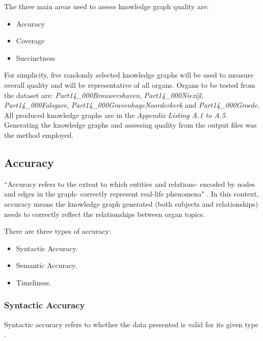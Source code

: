 The three main areas used to assess knowledge graph quality are: 

\vspace{-0.2cm}
\begin{itemize}
    \itemsep0em 
    \item Accuracy
    \vspace{-0.15cm}
    \item Coverage
    \vspace{-0.15cm}
    \item Succinctness
\end{itemize}
\vspace{-0.1cm}

For simplicity, five randomly selected knowledge graphs will be used to measure overall quality and will be representative of all organs. Organs to be tested from the dataset are: \textit{Part14\_000Brouwershaven}, \textit{Part14\_000Niezijl}, \textit{Part14\_000Folsgare}, \textit{Part14\_000GravenhageNoorderkerk} and \textit{Part14\_000Groede}. All produced knowledge graphs are in the \textit{Appendix Listing A.1 to A.5}. Generating the knowledge graphs and assessing quality from the output files was the method employed. 

\subsection{Accuracy}
\hspace{0.5cm} ``Accuracy refers to the extent to which entities and relations- encoded by nodes and edges in the graph- correctly represent real-life phenomena" \cite{knowledgegraphevaulationbook}. In this context, accuracy means the knowledge graph generated (both subjects and relationships) needs to correctly reflect the relationships between organ topics. 

\noindent There are three types of accuracy: 

\vspace{-0.2cm}
\begin{itemize}
    \itemsep0em 
\item Syntactic Accuracy.
\vspace{-0.1cm}
\item Semantic Accuracy.
\vspace{-0.1cm}
\item Timeliness.
\end{itemize}
\vspace{-0.4cm}

\subsubsection{Syntactic Accuracy}
\hspace{0.5cm} Syntactic accuracy refers to whether the data presented is valid for its given type \cite{knowledgegraphevaulationbook}.

